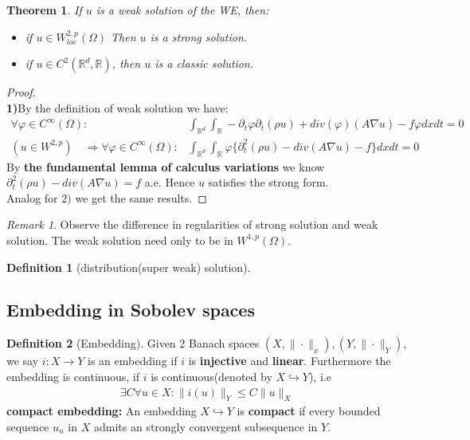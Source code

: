 \documentclass[a4paper,11pt,oneside,fleqn]{book}
\newtheorem{theorem}{Theorem}[section]
\theoremstyle{definition}
\newtheorem{definition}{Definition}[section]
\theoremstyle{remark}
\newtheorem*{remark}{Remark}
\begin{document}
\begin{theorem}
	If $u$ is a weak solution of the WE, then:
	\begin{itemize}
		\item if $u \in W^{2, p}_{loc}(\Omega)$  Then $u$ is a strong solution.
		\item if $u \in C^2(\mathbb{R}^d, \mathbb{R})$, then $u$ is a classic solution.
	\end{itemize} 
\end{theorem}
\begin{proof}\quad\\
\textbf{1)}By the definition of weak solution we have:
	\begin{align*}
		\forall \varphi \in C^\infty(\Omega):& \int_{\mathbb{R}^d} \int_\mathbb{R} - \partial_t \varphi \partial_t(\rho u) + div(\varphi)(A \nabla u) - f \varphi dx dt = 0\\
		(u \in W^{2, p}) \quad \Rightarrow \forall \varphi \in C^\infty(\Omega): & \int_{\mathbb{R}^d} \int_\mathbb{R} \varphi \{\partial^2_t (\rho u)   -  div(A \nabla u) -  f \}dxdt = 0
	\end{align*}
	By \textbf{the fundamental lemma of calculus variations} we know $\partial_t^2(\rho u) - div(A \nabla u) = f$ a.e. Hence $u$ satisfies the strong form. \\
	Analog for $2)$ we get the same results. 
\end{proof}
\begin{remark}
Observe the difference in regularities of strong solution and weak solution. The weak solution need only to be in $W^{1, p}(\Omega)$. 
\end{remark}

\begin{definition}[distribution(super weak) solution]
\end{definition}


\subsection{Embedding in Sobolev spaces}
\begin{definition}[Embedding]
	Given 2 Banach spaces $(X, \|\cdot\|_x), (Y, \|\cdot\|_Y)$, we say $i: X \rightarrow Y$ is an embedding if $i$ is \textbf{injective} and \textbf{linear}. Furthermore the embedding is continuous, if $i$ is continuous(denoted by $X\hookrightarrow Y$), i.e 
	\begin{align*}
		\exists C \forall u \in X: \|i(u)\|_Y \leq C \|u\|_X
	\end{align*}
	\textbf{compact embedding: }
	An embedding $X \hookrightarrow Y$ is \textbf{compact} if every bounded sequence $u_n$ in $X$ admits an strongly convergent subsequence in $Y$. 
\end{definition}
\end{document}
